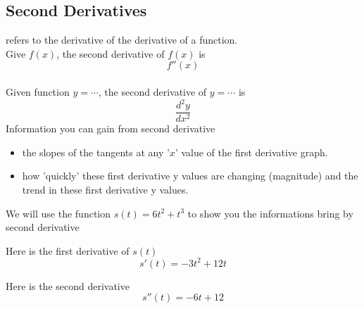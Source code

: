 \subsection{Second Derivatives}
\begin{definition}
    refers to the derivative of the derivative of a function. \\
    Give $f(x)$, the second derivative of $f(x)$ is $$f''(x)$$\\
    Given function $y = \cdots$, the second derivative of $y = \cdots$ is 
    $$\frac{d^2y}{dx^2}$$
    Information you can gain from second derivative
    \begin{itemize}
        \item the slopes of the tangents at any '$x$' value of the first derivative graph. 
        \item how 'quickly' these first derivative y values are changing (magnitude) and the trend in these first derivative y values. 
    \end{itemize}
\end{definition}

We will use the function $s(t) = 6t^2 + t^3$ to show you the informations bring by second derivative

\begin{center}
\end{center}

Here is the first derivative of $s(t)$ $$s'(t) = -3t^2 + 12t$$
\begin{center}
\end{center}

Here is the second derivative $$s''(t) = -6t + 12$$
\begin{center}
\end{center}


